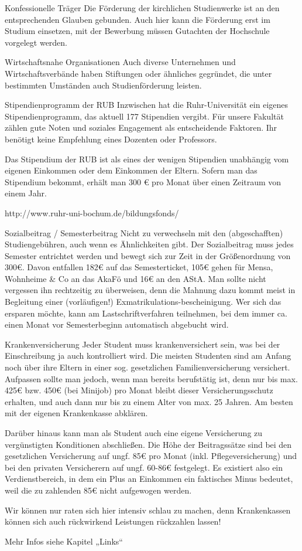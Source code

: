 Konfessionelle Träger
Die Förderung der kirchlichen Studienwerke ist an den entsprechenden Glauben gebunden. Auch hier kann die Förderung erst im Studium einsetzen, mit der Bewerbung müssen Gutachten der Hochschule vorgelegt werden.

Wirtschaftsnahe Organisationen
Auch diverse Unternehmen und Wirtschaftsverbände haben Stiftungen oder ähnliches gegründet, die unter bestimmten Umständen auch Studienförderung leisten.

Stipendienprogramm der RUB
Inzwischen hat die Ruhr-Universität ein eigenes Stipendienprogramm, das aktuell 177 Stipendien vergibt. Für unsere Fakultät zählen gute Noten und soziales Engagement als entscheidende Faktoren. Ihr benötigt keine Empfehlung eines Dozenten oder Professors.

Das Stipendium der RUB ist als eines der wenigen Stipendien unabhängig vom eigenen Einkommen oder dem Einkommen der Eltern. Sofern man das Stipendium bekommt, erhält man 300 € pro Monat über einen Zeitraum von einem Jahr.

http://www.ruhr-uni-bochum.de/bildungsfonds/

Sozialbeitrag / Semesterbeitrag
Nicht zu verwechseln mit den (abgeschafften) Studiengebühren, auch wenn es Ähnlichkeiten gibt. Der Sozialbeitrag muss jedes Semester entrichtet werden und bewegt sich zur Zeit in der Größenordnung von 300€. Davon entfallen 182€ auf das Semesterticket, 105€ gehen für Mensa, Wohnheime & Co an das AkaFö und 16€ an den AStA.
Man sollte nicht vergessen ihn rechtzeitig zu überweisen, denn die Mahnung dazu kommt meist in Begleitung einer (vorläufigen!) Exmatrikulations-bescheinigung. Wer sich das ersparen möchte, kann am Lastschriftverfahren teilnehmen, bei dem immer ca. einen Monat vor Semesterbeginn automatisch abgebucht wird.

Krankenversicherung
Jeder Student muss krankenversichert sein, was bei der Einschreibung ja auch kontrolliert wird. Die meisten Studenten sind am Anfang noch über ihre Eltern in einer sog. gesetzlichen Familienversicherung versichert. Aufpassen sollte man jedoch, wenn man bereits berufstätig ist, denn nur bis max. 425€ bzw. 450€ (bei Minijob) pro Monat bleibt dieser Versicherungsschutz erhalten, und auch dann nur bis zu einem Alter von max. 25 Jahren. Am besten mit der eigenen Krankenkasse abklären.

Darüber hinaus kann man als Student auch eine eigene Versicherung zu vergünstigten Konditionen abschließen. Die Höhe der Beitragssätze sind bei den gesetzlichen Versicherung auf ungf.  85€ pro Monat (inkl. Pflegeversicherung) und bei den privaten Versicherern auf ungf. 60-86€ festgelegt. Es existiert also ein Verdienstbereich, in dem ein Plus an Einkommen ein faktisches Minus bedeutet, weil die zu zahlenden 85€ nicht aufgewogen werden.

Wir können nur raten sich hier intensiv schlau zu machen, denn Krankenkassen können sich auch rückwirkend Leistungen rückzahlen lassen!

Mehr Infos siehe Kapitel „Links“